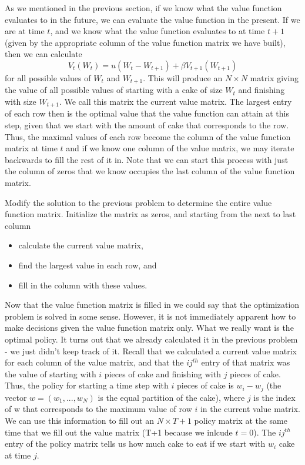 As we mentioned in the previous section, if we know what the value function evaluates to in the future, we can evaluate the value function in the present.
If we are at time $t$, and we know what the value function evaluates to at time $t+1$ (given by the appropriate column of the value function matrix we have built), then we can calculate
\[
V_t(W_t) = u(W_{t} - W_{t+1}) + \beta V_{t+1}(W_{t+1})
\]
for all possible values of $W_t$ and $W_{t+1}$.
This will produce an $N \times N$ matrix giving the value of all possible values of starting with a cake of size $W_t$ and finishing with size $W_{t+1}$.
We call this matrix the current value matrix.
The largest entry of each row then is the optimal value that the value function can attain at this step, given that we start with the amount of cake that corresponds to the row.
Thus, the maximal values of each row become the column of the value function matrix at time $t$ and if we know one column of the value matrix, we may iterate backwards to fill the rest of it in.
Note that we can start this process with just the column of zeros that we know occupies the last column of the value function matrix.

\begin{problem}
Modify the solution to the previous problem to determine the entire value function matrix.
Initialize the matrix as zeros, and starting from the next to last column 
\begin{itemize}
\item calculate the current value matrix,
\item find the largest value in each row, and
\item fill in the column with these values.
\end{itemize}
\end{problem}

Now that the value function matrix is filled in we could say that the optimization problem is solved in some sense.
However, it is not immediately apparent how to make decisions given the value function matrix only.
What we really want is the optimal policy.
It turns out that we already calculated it in the previous problem - we just didn't keep track of it.
Recall that we calculated a current value matrix for each column of the value matrix, and that the $ij^{th}$ entry of that matrix was the value of starting with $i$ pieces of cake and finishing with $j$ pieces of cake.
Thus, the policy for starting a time step with $i$ pieces of cake is $w_i - w_j$ (the vector $w = (w_1, ..., w_N)$ is the equal partition of the cake), where $j$ is the index of w that corresponds to the maximum value of row $i$ in the current value matrix.
We can use this information to fill out an $N \times T+1$ policy matrix at the same time that we fill out the value matrix (T+1 because we inlcude $t=0$).
The $ij^{th}$ entry of the policy matrix tells us how much cake to eat if we start with $w_i$ cake at time $j$. 

